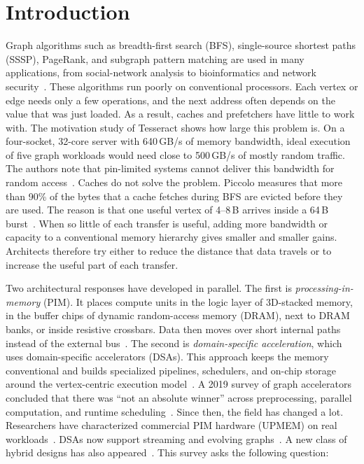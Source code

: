 \documentclass[journal,onecolumn]{IEEEtran}
\begin{document}
\section{Introduction}
Graph algorithms such as breadth-first search (BFS), single-source shortest paths (SSSP), PageRank, and subgraph pattern matching are used in many applications, from social-network analysis to bioinformatics and network security~\cite{ahn2015tesseract,ham2016graphicionado,asquini2025tc}. These algorithms run poorly on conventional processors. Each vertex or edge needs only a few operations, and the next address often depends on the value that was just loaded. As a result, caches and prefetchers have little to work with. The motivation study of Tesseract shows how large this problem is. On a four-socket, 32-core server with 640\,GB/s of memory bandwidth, ideal execution of five graph workloads would need close to 500\,GB/s of mostly random traffic. The authors note that pin-limited systems cannot deliver this bandwidth for random access~\cite{ahn2015tesseract}. Caches do not solve the problem. Piccolo measures that more than 90\% of the bytes that a cache fetches during BFS are evicted before they are used. The reason is that one useful vertex of 4--8\,B arrives inside a 64\,B burst~\cite{shin2025piccolo}. When so little of each transfer is useful, adding more bandwidth or capacity to a conventional memory hierarchy gives smaller and smaller gains. Architects therefore try either to reduce the distance that data travels or to increase the useful part of each transfer.

Two architectural responses have developed in parallel. The first is \emph{processing-in-memory} (PIM). It places compute units in the logic layer of 3D-stacked memory, in the buffer chips of dynamic random-access memory (DRAM), next to DRAM banks, or inside resistive crossbars. Data then moves over short internal paths instead of the external bus~\cite{ahn2015tesseract,song2018graphr,gomezluna2022prim}. The second is \emph{domain-specific acceleration}, which uses domain-specific accelerators (DSAs). This approach keeps the memory conventional and builds specialized pipelines, schedulers, and on-chip storage around the vertex-centric execution model~\cite{ham2016graphicionado,mukkara2018hats,yan2019graphdyns}. A 2019 survey of graph accelerators concluded that there was ``not an absolute winner'' across preprocessing, parallel computation, and runtime scheduling~\cite{gui2019survey}. Since then, the field has changed a lot. Researchers have characterized commercial PIM hardware (UPMEM) on real workloads~\cite{gomezluna2022prim,barkhordar2025alphapim}. DSAs now support streaming and evolving graphs~\cite{rahman2021jetstream,zhao2022tdgraph,gao2023mega}. A new class of hybrid designs has also appeared~\cite{shin2025piccolo,shin2025fala,yenimol2026cograf}. This survey asks the following question:
\end{document}
